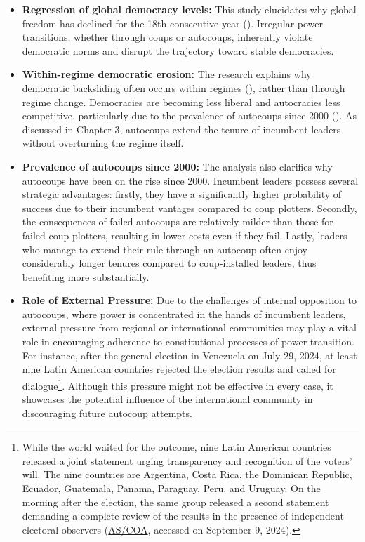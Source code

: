 \documentclass[
  12pt,
]{report}
\begin{document}
\begin{itemize}
\item
  \textbf{Regression of global democracy levels:} This study elucidates
  why global freedom has declined for the 18th consecutive year
  ().
  Irregular power transitions, whether through coups or autocoups,
  inherently violate democratic norms and disrupt the trajectory toward
  stable democracies.
\item
  \textbf{Within-regime democratic erosion:} The research explains why
  democratic backsliding often occurs within regimes
  (),
  rather than through regime change. Democracies are becoming less
  liberal and autocracies less competitive, particularly due to the
  prevalence of autocoups since 2000 (). As discussed in Chapter 3, autocoups extend the tenure of
  incumbent leaders without overturning the regime itself.
\item
  \textbf{Prevalence of autocoups since 2000:} The analysis also
  clarifies why autocoups have been on the rise since 2000. Incumbent
  leaders possess several strategic advantages: firstly, they have a
  significantly higher probability of success due to their incumbent
  vantages compared to coup plotters. Secondly, the consequences of
  failed autocoups are relatively milder than those for failed coup
  plotters, resulting in lower costs even if they fail. Lastly, leaders
  who manage to extend their rule through an autocoup often enjoy
  considerably longer tenures compared to coup-installed leaders, thus
  benefiting more substantially.
\item
  \textbf{Role of External Pressure:} Due to the challenges of internal
  opposition to autocoups, where power is concentrated in the hands of
  incumbent leaders, external pressure from regional or international
  communities may play a vital role in encouraging adherence to
  constitutional processes of power transition. For instance, after the
  general election in Venezuela on July 29, 2024, at least nine Latin
  American countries rejected the election results and called for
  dialogue\footnote{While the world waited for the outcome, nine Latin
    American countries released a joint statement urging transparency
    and recognition of the voters' will. The nine countries are
    Argentina, Costa Rica, the Dominican Republic, Ecuador, Guatemala,
    Panama, Paraguay, Peru, and Uruguay. On the morning after the
    election, the same group released a second statement demanding a
    complete review of the results in the presence of independent
    electoral observers
    (\href{https://www.as-coa.org/articles/how-have-international-leaders-responded-venezuelas-2024-election}{AS/COA},
    accessed on September 9, 2024).}. Although this pressure might not
  be effective in every case, it showcases the potential influence of
  the international community in discouraging future autocoup attempts.
\end{itemize}
\end{document}
